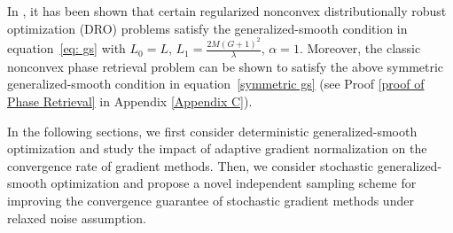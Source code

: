 \documentclass[10pt]{article} %
\def\eqref#1{equation~\ref{#1}}
\begin{document}
In \citet{jin2021nonconvex}, it has been shown that certain regularized nonconvex distributionally robust optimization (DRO) problems satisfy the generalized-smooth condition in \eqref{eq: gs} with $L_0=L$, $L_1 = \frac{2M(G+1)^2}{\lambda}$, $\alpha = 1$. Moreover, the classic nonconvex phase retrieval problem \citep{PhaseRetrieval1,PhaseRetrieval2} can be shown to satisfy the above symmetric generalized-smooth condition in \eqref{symmetric gs} (see Proof \ref{proof of Phase Retrieval} in Appendix \ref{Appendix C}). 


In the following sections, we first consider deterministic generalized-smooth optimization and study the impact of adaptive gradient normalization on the convergence rate of gradient methods. Then, we consider stochastic generalized-smooth optimization and propose a novel independent sampling scheme for improving the convergence guarantee of stochastic gradient methods under relaxed noise assumption.
\end{document}
